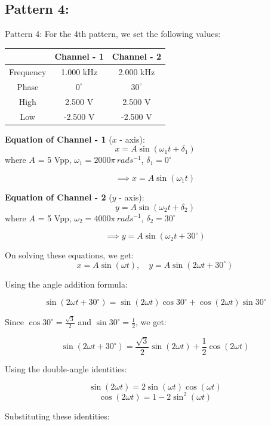 \documentclass[12pt]{article}
\begin{document}
\subsection{Pattern 4:}Pattern 4:
For the 4th pattern, we set the following values:
\begin{table}[H]
    \centering
    \begin{tabular}{|c|c|c|}
    \hline
        & \textbf{Channel - 1} & \textbf{Channel - 2}\\
    \hline
    Frequency & 1.000 kHz & 2.000 kHz\\
    \hline
    Phase     & $0^{\circ}$ & $30^{\circ}$\\
    \hline
    High      & 2.500 V & 2.500 V\\
    \hline
    Low       & -2.500 V & -2.500 V\\
    \hline
    \end{tabular}
\end{table}

\textbf{Equation of Channel - 1} ($x$ - axis):
\[
x = A \sin{\left(\omega_1 t + \delta_1\right)}
\]
where $A$ = 5 Vpp, $\omega_1 = 2000 \pi \, rad s^{-1}$, $\delta_1 = 0^{\circ}$

\[
\implies x = A \sin{\left(\omega_1 t\right)}
\]

\textbf{Equation of Channel - 2} ($y$ - axis):
\[
y = A \sin{\left(\omega_2 t + \delta_2\right)}
\]
where $A$ = 5 Vpp, $\omega_2 = 4000 \pi \, rad s^{-1}$, $\delta_2 = 30^{\circ}$

\[
\implies y = A \sin{\left(\omega_2 t + 30^\circ\right)}
\]

On solving these equations, we get:
\[
x = A \sin{\left(\omega t\right)}, \quad y = A \sin{\left(2 \omega t + 30^\circ\right)}
\]


Using the angle addition formula:

\[
\sin(2\omega t + 30^\circ) = \sin(2\omega t)\cos 30^\circ + \cos(2\omega t)\sin 30^\circ
\]

Since \( \cos 30^\circ = \frac{\sqrt{3}}{2} \) and \( \sin 30^\circ = \frac{1}{2} \), we get:

\[
\sin(2\omega t + 30^\circ) = \frac{\sqrt{3}}{2} \sin(2\omega t) + \frac{1}{2} \cos(2\omega t)
\]

Using the double-angle identities:

\[
\sin(2\omega t) = 2 \sin(\omega t)\cos(\omega t)
\]
\[
\cos(2\omega t) = 1 - 2\sin^2(\omega t)
\]

Substituting these identities:
\end{document}
